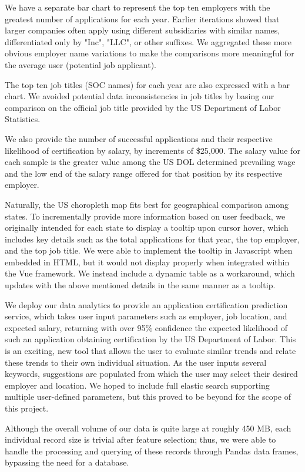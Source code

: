 \documentclass[sigconf]{acmart}
\begin{document}
We have a separate bar chart to represent the top ten employers with the greatest number of applications for each year. 
Earlier iterations showed that larger companies often apply using different subsidiaries with similar names, 
differentiated only by "Inc", "LLC", or other suffixes. We aggregated these more obvious employer name variations 
to make the comparisons more meaningful for the average user (potential job applicant). 

The top ten job titles (SOC names) for each year are also expressed with a bar chart. We avoided 
potential data inconsistencies in job titles by basing our comparison on the official job title provided 
by the US Department of Labor Statistics. 

We also provide the number of successful applications and their respective likelihood of certification 
by salary, by increments of \$25,000. The salary value for each sample is the greater value among 
the US DOL determined prevailing wage and the low end of the salary range offered for that position by 
its respective employer. 

Naturally, the US choropleth map fits best for geographical comparison among states. To incrementally 
provide more information based on user feedback, we originally intended for each state to display a 
tooltip upon cursor hover, which includes key details such as the total applications for that year, the top employer, and the top 
job title. We were able to implement the tooltip in Javascript when embedded in HTML, but it would not display 
properly when integrated within the Vue framework. We instead include a dynamic table as a workaround, which updates with 
the above mentioned details in the same manner as a tooltip. 

We deploy our data analytics to provide an application certification prediction service, 
which takes user input parameters such as employer, job location, 
and expected salary, returning with over 95\% confidence the expected likelihood of 
such an application obtaining certification by the US Department of Labor. 
This is an exciting, new tool that allows the user to evaluate similar trends and relate these 
trends to their own individual situation. 
As the user inputs several keywords, suggestions are populated from which the user may select 
their desired employer and location. We hoped to include full elastic search supporting multiple 
user-defined parameters, but this proved to be beyond for the scope of this project. 

Although the overall volume of our data is quite large at roughly 450 MB, 
each individual record size is trivial after feature selection; thus, we 
were able to handle the processing and querying of these records through Pandas data frames, 
bypassing the need for a database. 
\end{document}
